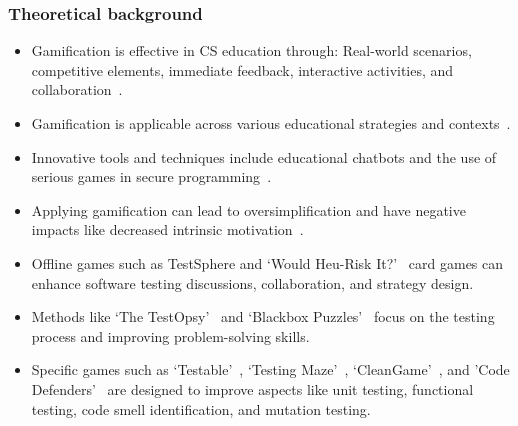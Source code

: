 \documentclass[aspectratio=169]{beamer}
\begin{document}
\begin{frame}[allowframebreaks]
    \frametitle{Theoretical background}
    \begin{itemize}
        \item Gamification is effective in CS education through: Real-world scenarios, competitive elements, immediate feedback, interactive activities, and collaboration~\cite{8658524}.
        \item Gamification is applicable across various educational strategies and contexts~\cite{informatics9040075, hirsh2022, Tan_Chong_2023}.%
        \item Innovative tools and techniques include educational chatbots and the use of serious games in secure programming~\cite{10.1145/3350768.3352456,8802503}.
        \item Applying gamification can lead to oversimplification and have negative impacts like decreased intrinsic motivation~\cite{8658524}.
        \item Offline games such as TestSphere and `Would Heu-Risk It?'~\cite{BibEntry2023Sep} card games can enhance software testing discussions, collaboration, and strategy design.
        \item Methods like `The TestOpsy'~\cite{ChrisKenst2022Jun} and `Blackbox Puzzles'~\cite{BibEntry2022Feb} focus on the testing process and improving problem-solving skills.
        \item Specific games such as `Testable'~\cite{8994972}, `Testing Maze'~\cite{10.1145/3613372.3614191}, `CleanGame'~\cite{10.1145/3350768.3352490}, and 'Code Defenders'~\cite{10.1145/3287324.3287471, 9155973} are designed to improve aspects like unit testing, functional testing, code smell identification, and mutation testing.
    \end{itemize}
\end{frame}
\end{document}
